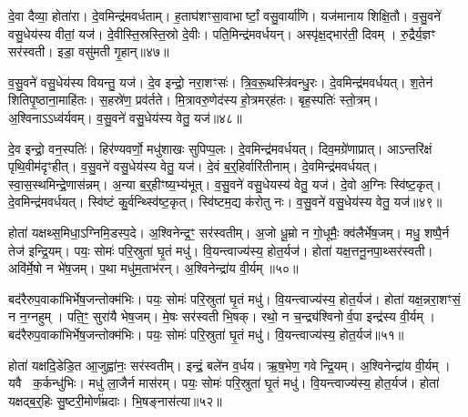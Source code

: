 दे॒वा दैव्या॒ होता॑रा।
दे॒वमिन्द्र॑मवर्धताम्।
ह॒ताघ॑शꣳसा॒वाभार्ष्टां॒ वसु॒वार्या॑णि।
यज॑मानाय शिक्षि॒तौ।
व॒सु॒वने॑ वसु॒धेय॑स्य वीतां॒ यज॑।
दे॒वीस्ति॒स्रस्ति॒स्रो दे॒वीः।
पति॒मिन्द्र॑मवर्धयन्।
अस्पृ॑क्ष॒द्भार॑ती॒ दिवम्।
रु॒द्रैर्य॒ज्ञꣳ सर॑स्वती।
इडा॒ वसु॑मती गृ॒हान्॥४७॥

व॒सु॒वने॑ वसु॒धेय॑स्य वियन्तु॒ यज॑।
दे॒व इन्द्रो॒ नरा॒शꣳसः॑।
त्रि॒व॒रू॒थस्त्रि॑वन्धु॒रः।
दे॒वमिन्द्र॑मवर्धयत्।
श॒तेन॑ शिति\-पृ॒ष्ठाना॒माहि॑तः।
स॒हस्रे॑ण॒ प्रव॑र्तते।
मि॒त्रावरु॒णेद॑स्य हो॒त्रमर्‌\mbox{}ह॑तः।
बृह॒स्पतिः॑ स्तो॒त्रम्।
अ॒श्विना\-ऽऽध्व॑र्यवम्।
व॒सु॒वने॑ वसु॒धेय॑स्य वेतु॒ यज॑॥४८॥

दे॒व इन्द्रो॒ वन॒स्पतिः॑।
हिर॑ण्यवर्णो॒ मधु॑शाखः सुपिप्प॒लः।
दे॒वमिन्द्र॑मवर्धयत्।
दिव॒मग्रे॑णाप्रात्।
आऽन्तरि॑क्षं पृथि॒वीम॑दृꣳहीत्।
व॒सु॒वने॑ वसु॒धेय॑स्य वेतु॒ यज॑।
दे॒वं ब॒र्॒हिर्वारि॑तीनाम्।
दे॒वमिन्द्र॑मवर्धयत्।
स्वा॒स॒स्थमिन्द्रे॒णास॑न्नम्।
अ॒न्या ब॒र्॒हीꣳष्य॒भ्य॑भूत्।
व॒सु॒वने॑ वसु॒धेयस्य॑ वेतु॒ यज॑।
दे॒वो अ॒ग्निः स्वि॑ष्ट॒कृत्।
दे॒वमिन्द्र॑मवर्धयत्।
स्वि॑ष्टं कु॒र्वन्थ्स्वि॑ष्ट॒कृत्।
स्वि॑ष्टम॒द्य क॑रोतु नः।
व॒सु॒वने॑ वसु॒धेय॑स्य वेतु॒ यज॑॥४९॥

होता॑ यक्षथ्स॒मिधा॒\-ऽग्निमि॒डस्प॒दे।
अ॒श्विनेन्द्र॒ꣳ॒ सर॑स्वतीम्।
अ॒जो धू॒म्रो न गो॒धूमैः॒ क्व॑लैर्भेष॒जम्।
मधु॒ शष्पै॒र्न तेज॑ इन्द्रि॒यम्।
पयः॒ सोमः॑ परि॒स्रुता॑ घृ॒तं मधु॑।
वि॒यन्त्वाज्य॑स्य॒ होत॒र्यज॑।
होता॑ यक्ष॒त्तनू॒नपा॒थ्सर॑स्वती।
अवि॑र्मे॒षो न भे॑ष॒जम्।
प॒था मधु॑म॒ताभ॑रन्।
अ॒श्विनेन्द्रा॑य वी॒र्यम्॥५०॥

बद॑रैरुप॒वाका॑भिर्भेष॒जन्तोक्म॑भिः।
पयः॒ सोमः॑ परि॒स्रुता॑ घृ॒तं मधु॑।
वि॒यन्त्वाज्य॑स्य॒ होत॒र्यज॑।
होता॑ यक्ष॒न्नरा॒शꣳसं॒ न न॒ग्नहुम्।
पति॒ꣳ॒ सुरा॑यै भेष॒जम्।
मे॒षः सर॑स्वती भि॒षक्।
रथो॒ न च॒न्द्र्य॑श्विनोर्व॒पा इन्द्र॑स्य वी॒र्यम्।
बद॑रैरुप॒वाका॑भिर्भेष॒जन्तोक्म॑भिः।
पयः॒ सोमः॑ परि॒स्रुता॑ घृ॒तं मधु॑।
वि॒यन्त्वाज्य॑स्य॒ होत॒र्यज॑॥५१॥

होता॑ यक्षदि॒डेडि॒त आ॒जुह्वा॑नः॒ सर॑स्वतीम्।
इन्द्रं॒ बले॑न व॒र्धय\sn{}।
ऋ॒ष॒भेण॒ गवेन्द्रि॒यम्।
अ॒श्विनेन्द्रा॑य वी॒र्यम्।
यवै क॒र्कन्धु॑भिः।
मधु॑ ला॒जैर्न मास॑रम्।
पयः॒ सोमः॑ परि॒स्रुता॑ घृ॒तं मधु॑।
वि॒यन्त्वाज्य॑स्य॒ होत॒र्यज॑।
होता॑ यक्षद्ब॒र्॒हिः सु॒ष्टरी॒मोर्ण॑म्रदाः।
भि॒षङ्नास॑त्या॥५२॥

